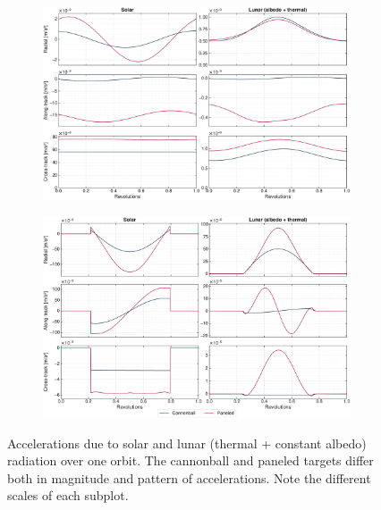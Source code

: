 \begin{figure}[tb]
    \centering
    \begin{subfigure}[c]{\textwidth}
        \includegraphics[width=\textwidth]{figures/plots/acc_solarvslunar_jun.pdf}
        \label{fig:acc-solarvslunar-jun}
     \end{subfigure}

     \bigskip

     \begin{subfigure}[c]{\textwidth}
        \includegraphics[width=\textwidth]{figures/plots/acc_solarvslunar_sep.pdf}
        \label{fig:acc-solarvslunar-sep}
     \end{subfigure}

    \caption{Accelerations due to solar and lunar (thermal + constant albedo) radiation over one orbit. The cannonball and paneled targets differ both in magnitude and pattern of accelerations. Note the different scales of each subplot.}
    \label{fig:acc-solarvslunar}
\end{figure}

